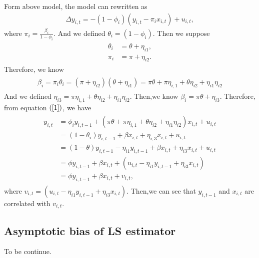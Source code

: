 \documentclass[12pt,a4paper,hyperref]{article}
\begin{document}
 Form above model, the model can rewritten as
 \begin{align}
 \Delta y_{i,t}=-\left( 1-\phi_{i}\right)\left(y_{i,t}- \pi_{i}x_{i,t}  \right)+u_{i,t},
 \end{align}
where $\pi_{i}=\frac{\beta_{i}}{1-\phi_{i}}$. And we defined $\theta_{i}=\left(1-\phi_{i} \right)$.
Then we suppose
\begin{align}
\begin{split}
\theta_{i}&=\theta+\eta_{i1}, \\
\pi_{i}&=\pi+\eta_{i2}.
\end{split}
\end{align}
Therefore, we know
\begin{align}
\begin{split}
\beta_{i}=\pi_{i}\theta_{i}=\left(\pi+\eta_{i2}  \right) \left( \theta+\eta_{i1}\right)=\pi\theta+\pi\eta_{i,1}+\theta\eta_{i2}+\eta_{i1}\eta_{i2}
\end{split}
\end{align}
And we defined $\eta_{i3}=\pi\eta_{i,1}+\theta\eta_{i2}+\eta_{i1}\eta_{i2} $. Then,we know $\beta_{i}=\pi \theta+\eta_{i3}$.
Therefore, from equation $(\ref{1})$, we have
\begin{align}
\begin{split}
y_{i,t}&=\phi_{i} y_{i,t-1}+ \left(  \pi\theta+\pi\eta_{i,1}+\theta\eta_{i2}+\eta_{i1}\eta_{i2}   \right)x_{i,t}+u_{i,t} \\
&=\left(1-\theta_{i}  \right)y_{i,t-1}+\beta x_{i,t}+\eta_{i,3}x_{i,t}+u_{i,t} \\
&=(1-\theta)y_{i,t-1}-\eta_{i1}y_{i,t-1}+\beta x_{i,t}+\eta_{i3} x_{i,t}+u_{i,t} \\
&=\phi y_{i,t-1}+ \beta x_{i,t}+\left(u_{i,t}-\eta_{i1} y_{i,t-1}+\eta_{i3} x_{i,t}  \right) \\
&=\phi y_{i,t-1}+ \beta x_{i,t}+v_{i,t},
\end{split}
\end{align}
where $v_{i,t}=\left(u_{i,t}-\eta_{i1} y_{i,t-1}+\eta_{i3} x_{i,t}  \right)$.
Then,we can see that  $y_{i,t-1}$ and $x_{i,t}$ are correlated with $v_{i,t}$.


\subsection{Asymptotic bias of LS estimator}
To be continue.
\end{document}
